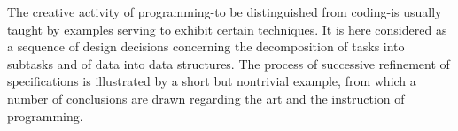 \vspace{5mm}
The creative activity of programming-to be distinguished from coding-is usually
taught by examples serving to exhibit certain techniques.  It is here
considered as a sequence of design decisions concerning the decomposition of
tasks into subtasks and of data into data structures.  The process of
successive refinement of specifications is illustrated by a short but
nontrivial example, from which a number of conclusions are drawn regarding the
art and the instruction of programming.
